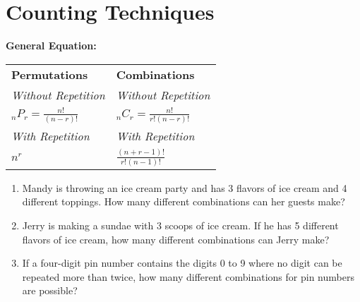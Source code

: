 \section{Counting Techniques}

\bigskip
\textbf{General Equation:} 

\begin{tabularx}{\textwidth}{*2{@{}>{\centering\arraybackslash}X}}
\textbf{Permutations} & \textbf{Combinations}\\
\textit{Without Repetition} & \textit{Without Repetition}\\
$_nP_r=\frac{n!}{(n-r)!}$ & $_nC_r=\frac{n!}{r!(n-r)!}$\\[2em]
\textit{With Repetition} & \textit{With Repetition}\\
$n^r$ & $\frac{(n+r-1)!}{r!(n-1)!}$
\end{tabularx}

\vfill
\begin{enumerate}[labelindent=*,style=multiline,leftmargin=*,label=\textbf{Example \arabic*:}]
\item Mandy is throwing an ice cream party and has 3 flavors of ice cream and 4 different toppings. How many different combinations can her guests make?

\vfill\item Jerry is making a sundae with 3 scoops of ice cream. If he has 5 different flavors of ice cream, how many different combinations can Jerry make?

\vfill\item If a four-digit pin number contains the digits 0 to 9 where no digit can be repeated more than twice, how many different combinations for pin numbers are possible?
\end{enumerate}

